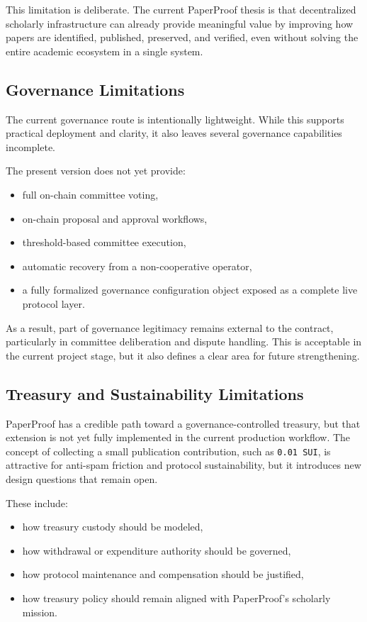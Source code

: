 \documentclass[journal]{IEEEtran}
\begin{document}
This limitation is deliberate. The current PaperProof thesis is that decentralized scholarly infrastructure can already provide meaningful value by improving how papers are identified, published, preserved, and verified, even without solving the entire academic ecosystem in a single system.

\subsection{Governance Limitations}

The current governance route is intentionally lightweight. While this supports practical deployment and clarity, it also leaves several governance capabilities incomplete.

The present version does not yet provide:
\begin{itemize}
    \item full on-chain committee voting,
    \item on-chain proposal and approval workflows,
    \item threshold-based committee execution,
    \item automatic recovery from a non-cooperative operator,
    \item a fully formalized governance configuration object exposed as a complete live protocol layer.
\end{itemize}


As a result, part of governance legitimacy remains external to the contract, particularly in committee deliberation and dispute handling. This is acceptable in the current project stage, but it also defines a clear area for future strengthening.

\subsection{Treasury and Sustainability Limitations}

PaperProof has a credible path toward a governance-controlled treasury, but that extension is not yet fully implemented in the current production workflow. The concept of collecting a small publication contribution, such as \texttt{0.01 SUI}, is attractive for anti-spam friction and protocol sustainability, but it introduces new design questions that remain open.

These include:
\begin{itemize}
    \item how treasury custody should be modeled,
    \item how withdrawal or expenditure authority should be governed,
    \item how protocol maintenance and compensation should be justified,
    \item how treasury policy should remain aligned with PaperProof's scholarly mission.
\end{itemize}
\end{document}
